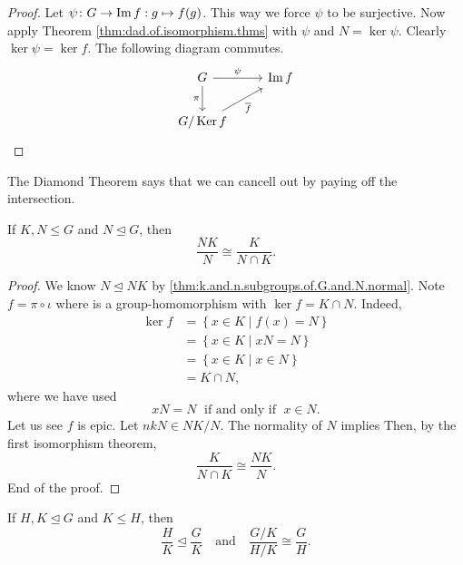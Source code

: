 \documentclass[11pt,a4paper]{article}
\begin{document}
\begin{proof}
    Let \(\psi \colon G\to \operatorname{Im} f : g\mapsto f(g) \).
    This way we force \(\psi\) to be surjective.
    Now apply  Theorem \ref{thm:dad.of.isomorphism.thms} with  \( \psi\) and \(N = \ker \psi\).
    Clearly \(\ker \psi = \ker f\).
    The following diagram commutes.
    \[\begin{tikzcd}
        G \arrow[r, "\psi"] \arrow[d, "\pi"'] & \im f \\
        G/\ker f   \arrow[ru, "\overline{f}"']    &  
        \end{tikzcd}\]
\end{proof}

The Diamond Theorem says that we can cancell out by paying off the intersection.

\begin{cor}
    If \(K,N \leq G\) and \(N\unlhd G\), then \[\frac{NK}{N}\cong \frac{K}{N\cap K}.\]
\end{cor}

\begin{proof}
We know \(N\unlhd NK\) by   \ref{thm:k.and.n.subgroups.of.G.and.N.normal}.
Note \(f = \pi \circ \iota\) where is a group-homomorphism with \(\ker f = K\cap N\).
Indeed,
\begin{align*}
\ker f &= \left\{ x\in K \mid f(x) = N \right\}\\
&= \left\{ x\in K \mid xN = N   \right\}\\
&= \left\{ x\in K\mid x\in N \right\}\\
&= K\cap N,
\end{align*}
where we have used \[xN = N \;\text{ if and only if }\; x\in N.\]
Let us see \(f\) is epic.
Let \(nkN \in NK/N\).
The normality of \(N\) implies 
Then, by the first isomorphism theorem, 
\[\frac{K}{N\cap K}\cong \frac{NK}{N}.\]
End of the proof.
\end{proof}


\begin{cor}
    If \(H,K\unlhd G\) and \(K\leq H\), then 
    \[\frac{H}{K}  \unlhd \frac{G}{K} \quad\text{and}\quad \frac{G/ K}{H/K}\cong \frac{G}{H}.\]
\end{cor}
\end{document}
